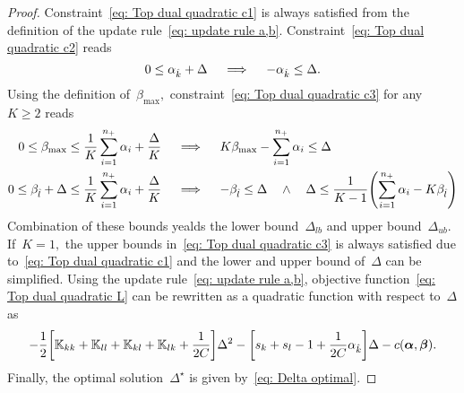 \begin{proof}
  Constraint~\eqref{eq: Top dual quadratic c1} is always satisfied from the definition of the update rule~\eqref{eq: update rule a,b}. Constraint~\eqref{eq: Top dual quadratic c2} reads
  \begin{equation*}
    0 \leq \alpha_{\hat{k}} + \Delta
    \quad \implies \quad
    - \alpha_{\hat{k}} \leq \Delta.
  \end{equation*}
  Using the definition of~$\beta_{\max},$ constraint~\eqref{eq: Top dual quadratic c3} for any~$K \geq 2$ reads
  \begin{align*}
    0 \leq \beta_{\max} \leq \frac{1}{K} \sum_{i = 1}^{\npos} \alpha_i + \frac{\Delta}{K} 
    & \quad \implies \quad
    K\beta_{\max} - \sum_{i = 1}^{\npos} \alpha_i \leq \Delta \\
    0 \leq \betal + \Delta \leq \frac{1}{K} \sum_{i = 1}^{\npos} \alpha_i + \frac{\Delta}{K}
    & \quad \implies \quad
    -\betal \leq \Delta \quad \land \quad \Delta \leq \frac{1}{K-1}\Brac{\sum_{i = 1}^{\npos} \alpha_i - K \betal}
  \end{align*}
  Combination of these bounds yealds the lower bound~$\Delta_{lb}$ and upper bound~$\Delta_{ub}.$ If~$K = 1,$ the upper bounds in~\eqref{eq: Top dual quadratic c3} is always satisfied due to~\eqref{eq: Top dual quadratic c1} and the lower and upper bound of~$\Delta$ can be simplified. Using the update rule~\eqref{eq: update rule a,b}, objective function~\eqref{eq: Top dual quadratic L} can be rewritten as a quadratic function with respect to~$\Delta$ as
  \begin{equation*}
    - \frac{1}{2} \Brac[s]{\K_{kk} + \K_{ll} + \K_{kl} + \K_{lk} + \frac{1}{2C}} \Delta^2
    - \Brac[s]{s_k + s_l - 1 + \frac{1}{2C} \alphak} \Delta
    - c(\bm{\alpha}, \bm{\beta}).
  \end{equation*}
  Finally, the optimal solution~$\Delta^{\star}$ is given by~\eqref{eq: Delta optimal}.
\end{proof}



